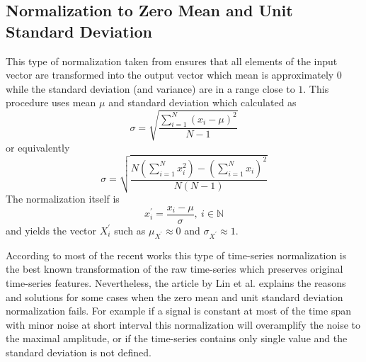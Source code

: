 \subsection{Normalization to Zero Mean and Unit Standard Deviation} \label{sect:normalization}
This type of normalization taken from \cite{citeulike:3815880} ensures that all elements of the input vector are transformed into the output vector which mean is approximately $0$ while the standard deviation (and variance) are in a range close to $1$.
This procedure uses mean $\mu$ and standard deviation which calculated as 
\begin{equation}
\sigma = \sqrt{ \frac{ \sum_{i=1}^{N} (x_{i} - \mu)^{2} }{ N - 1 } }
\end{equation}
or equivalently
\begin{equation}
\sigma = \sqrt{ \frac{
                  N \left( \sum_{i=1}^{N} x_{i}^{2}  \right) - 
                  \left( \sum_{i=1}^{N} x_{i} \right) ^{2}
                }{
                  N(N-1)
                }  
          }
\end{equation}
The normalization itself is 
\begin{equation}
x_{i}^{'} = \frac{x_{i} - \mu}{\sigma}, \: i \in \mathbb{N}
\end{equation}
and yields the vector $X_{i}^{'}$ such as $\mu_{X^{'}} \approx 0$ and $\sigma_{X^{'}} \approx 1$.

According to most of the recent works \cite{citeulike:3815880} \cite{citeulike:2821475} \cite{citeulike:3978002} this type of time-series normalization is the best known transformation of the raw time-series which preserves original time-series features. Nevertheless, the article by Lin et al. \cite{citeulike:2821475} explains the reasons and solutions for some cases when the zero mean and unit standard deviation normalization fails. For example if a signal is constant at most of the time span with minor noise at short interval this normalization will overamplify the noise to the maximal amplitude, or if the time-series contains only single value and the standard deviation is not defined.